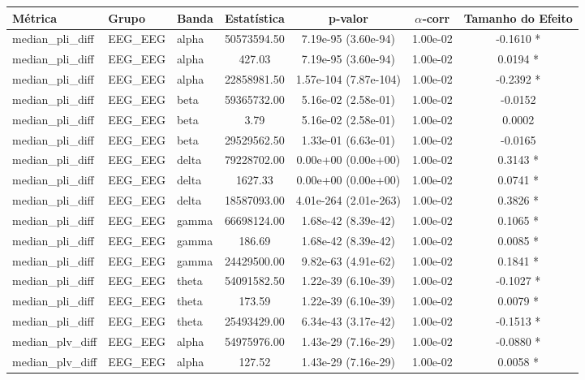 \begin{tabular}{l l l c c c c}
    \toprule
    Métrica & Grupo & Banda & Estatística & p‑valor & $\alpha$‑corr & Tamanho do Efeito \\
    \midrule
    median\_pli\_diff & EEG\_EEG & alpha & 50573594.50 & 7.19e-95 (3.60e-94) & 1.00e-02 & -0.1610 * \\
    median\_pli\_diff & EEG\_EEG & alpha & 427.03 & 7.19e-95 (3.60e-94) & 1.00e-02 & 0.0194 * \\
    median\_pli\_diff & EEG\_EEG & alpha & 22858981.50 & 1.57e-104 (7.87e-104) & 1.00e-02 & -0.2392 * \\
    median\_pli\_diff & EEG\_EEG & beta & 59365732.00 & 5.16e-02 (2.58e-01) & 1.00e-02 & -0.0152  \\
    median\_pli\_diff & EEG\_EEG & beta & 3.79 & 5.16e-02 (2.58e-01) & 1.00e-02 & 0.0002  \\
    median\_pli\_diff & EEG\_EEG & beta & 29529562.50 & 1.33e-01 (6.63e-01) & 1.00e-02 & -0.0165  \\
    median\_pli\_diff & EEG\_EEG & delta & 79228702.00 & 0.00e+00 (0.00e+00) & 1.00e-02 & 0.3143 * \\
    median\_pli\_diff & EEG\_EEG & delta & 1627.33 & 0.00e+00 (0.00e+00) & 1.00e-02 & 0.0741 * \\
    median\_pli\_diff & EEG\_EEG & delta & 18587093.00 & 4.01e-264 (2.01e-263) & 1.00e-02 & 0.3826 * \\
    median\_pli\_diff & EEG\_EEG & gamma & 66698124.00 & 1.68e-42 (8.39e-42) & 1.00e-02 & 0.1065 * \\
    median\_pli\_diff & EEG\_EEG & gamma & 186.69 & 1.68e-42 (8.39e-42) & 1.00e-02 & 0.0085 * \\
    median\_pli\_diff & EEG\_EEG & gamma & 24429500.00 & 9.82e-63 (4.91e-62) & 1.00e-02 & 0.1841 * \\
    median\_pli\_diff & EEG\_EEG & theta & 54091582.50 & 1.22e-39 (6.10e-39) & 1.00e-02 & -0.1027 * \\
    median\_pli\_diff & EEG\_EEG & theta & 173.59 & 1.22e-39 (6.10e-39) & 1.00e-02 & 0.0079 * \\
    median\_pli\_diff & EEG\_EEG & theta & 25493429.00 & 6.34e-43 (3.17e-42) & 1.00e-02 & -0.1513 * \\
    median\_plv\_diff & EEG\_EEG & alpha & 54975976.00 & 1.43e-29 (7.16e-29) & 1.00e-02 & -0.0880 * \\
    median\_plv\_diff & EEG\_EEG & alpha & 127.52 & 1.43e-29 (7.16e-29) & 1.00e-02 & 0.0058 * \\

\end{tabular}
